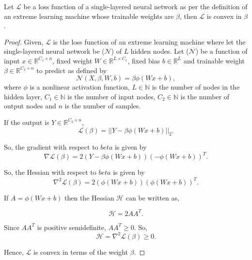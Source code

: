 \documentclass[10pt,a4paper]{amsart}
\begin{document}
\begin{theorem}
Let \(\mathcal{L}\) be a loss function of a single-layered neural network as per the definition of an extreme learning machine whose trainable weights are \(\beta\), then \(\mathcal{L}\) is convex in \(\beta\).
\end{theorem}

\begin{proof}
\label{pf: elmconvexity}
Given, \(\mathcal{L}\) is the loss function of an extreme learning machine where let the single-layered neural network be (\(\mathcal{N}\)) of \(L\) hidden nodes. Let (\(\mathcal{N}\)) be a function of input \(x \in \mathbb{R}^{C_1 \times n}\), fixed weight \(W \in \mathbb{R}^{L \times C_1}\), fixed bias \(b \in \mathbb{R}^L\) and trainable weight \(\beta \in \mathbb{R}^{C_2 \times n}\)  to predict as defined by
\begin{equation}
\mathcal{N}(X, \beta, W, b) = \beta\phi(Wx + b),
\end{equation}
where \(\phi\) is a nonlinear activation function, \(L \in \mathbb{N}\) is the number of nodes in the hidden layer, \(C_1 \in \mathbb{N}\) is the number of input nodes, \(C_2 \in \mathbb{N}\) is the number of output nodes and \(n\) is the number of samples.

If the output is \(Y \in \mathbb{R}^{C_2 \times n}\), 
\begin{equation}
\mathcal{L}(\beta) = ||Y - \beta\phi(Wx + b)||_2.
\end{equation}

So, the gradient with respect to \(beta\) is given by
\begin{equation}
\nabla\mathcal{L}(\beta) = 2(Y - \beta\phi(Wx + b))(-\phi(Wx + b))^T.
\end{equation}

So, the Hessian with respect to \(beta\) is given by
\begin{equation}
\nabla^2\mathcal{L}(\beta) = 2(\phi(Wx + b))(\phi(Wx + b))^T.
\end{equation}

If \(A = \phi(Wx + b)\) then the Hessian \(\mathcal{H}\) can be written as,

\begin{equation}
\mathcal{H} = 2 AA^T.
\end{equation}

Since \(AA^T\) is positive semidefinite, \(AA^T \geq 0\).
So,
\begin{equation}
    \mathcal{H} = \nabla^2\mathcal{L}(\beta) \geq 0.
\end{equation}

Hence, \(\mathcal{L}\) is convex in terms of the weight \(\beta\).

\end{proof}
\end{document}
